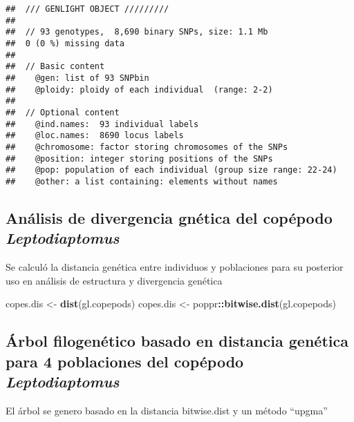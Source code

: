 \documentclass[]{article}
\newenvironment{Shaded}{\begin{snugshade}}{\end{snugshade}}
\newcommand{\KeywordTok}[1]{\textcolor[rgb]{0.13,0.29,0.53}{\textbf{#1}}}
\newcommand{\NormalTok}[1]{#1}
\newcommand{\OperatorTok}[1]{\textcolor[rgb]{0.81,0.36,0.00}{\textbf{#1}}}
\newcommand{\StringTok}[1]{\textcolor[rgb]{0.31,0.60,0.02}{#1}}
\begin{document}
\begin{verbatim}
##  /// GENLIGHT OBJECT /////////
## 
##  // 93 genotypes,  8,690 binary SNPs, size: 1.1 Mb
##  0 (0 %) missing data
## 
##  // Basic content
##    @gen: list of 93 SNPbin
##    @ploidy: ploidy of each individual  (range: 2-2)
## 
##  // Optional content
##    @ind.names:  93 individual labels
##    @loc.names:  8690 locus labels
##    @chromosome: factor storing chromosomes of the SNPs
##    @position: integer storing positions of the SNPs
##    @pop: population of each individual (group size range: 22-24)
##    @other: a list containing: elements without names
\end{verbatim}

\hypertarget{anuxe1lisis-de-divergencia-gnuxe9tica-del-copuxe9podo-leptodiaptomus}{%
\subsection{\texorpdfstring{Análisis de divergencia gnética del copépodo
\emph{Leptodiaptomus}}{Análisis de divergencia gnética del copépodo Leptodiaptomus}}\label{anuxe1lisis-de-divergencia-gnuxe9tica-del-copuxe9podo-leptodiaptomus}}

Se calculó la distancia genética entre individuos y poblaciones para su
posterior uso en análisis de estructura y divergencia genética

\begin{Shaded}
\begin{Highlighting}[]
\NormalTok{copes.dis <-}\StringTok{ }\KeywordTok{dist}\NormalTok{(gl.copepods)}
\NormalTok{copes.dis <-}\StringTok{ }\NormalTok{poppr}\OperatorTok{::}\KeywordTok{bitwise.dist}\NormalTok{(gl.copepods) }
\end{Highlighting}
\end{Shaded}

\hypertarget{uxe1rbol-filogenuxe9tico-basado-en-distancia-genuxe9tica-para-4-poblaciones-del-copuxe9podo-leptodiaptomus}{%
\subsection{\texorpdfstring{Árbol filogenético basado en distancia
genética para 4 poblaciones del copépodo
\emph{Leptodiaptomus}}{Árbol filogenético basado en distancia genética para 4 poblaciones del copépodo Leptodiaptomus}}\label{uxe1rbol-filogenuxe9tico-basado-en-distancia-genuxe9tica-para-4-poblaciones-del-copuxe9podo-leptodiaptomus}}

El árbol se genero basado en la distancia bitwise.dist y un método
``upgma''
\end{document}
